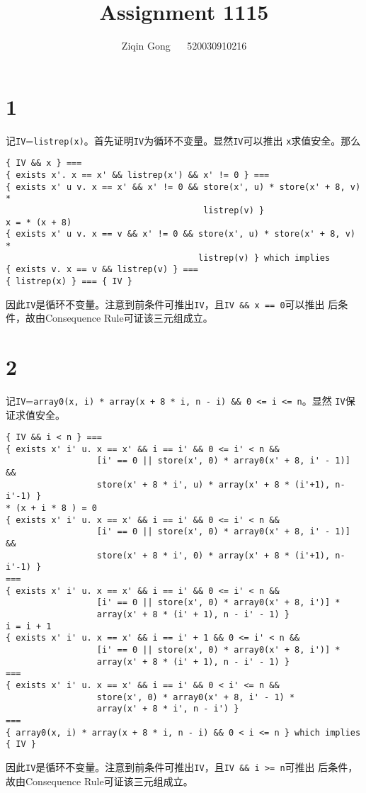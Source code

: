 \documentclass[11pt]{article}
\title{Assignment 1115}
\author{Ziqin Gong $\quad$ 520030910216}
\date{}
\newcommand{\iv}{\texttt{IV}}
\begin{document}
  \maketitle

  \section*{1}

    记\texttt{IV}=\texttt{listrep(x)}。首先证明\iv 为循环不变量。显然\iv 可以推出
    \texttt{x}求值安全。那么

    \begin{lstlisting}
{ IV && x } ===
{ exists x'. x == x' && listrep(x') && x' != 0 } ===
{ exists x' u v. x == x' && x' != 0 && store(x', u) * store(x' + 8, v) *
                                       listrep(v) }
x = * (x + 8)
{ exists x' u v. x == v && x' != 0 && store(x', u) * store(x' + 8, v) *
                                      listrep(v) } which implies
{ exists v. x == v && listrep(v) } ===
{ listrep(x) } === { IV }
    \end{lstlisting}

    因此\iv 是循环不变量。注意到前条件可推出\iv，且\texttt{IV \&\& x == 0}可以推出
    后条件，故由Consequence Rule可证该三元组成立。

  \section*{2}

    记\iv=\texttt{array0(x, i) * array(x + 8 * i, n - i) \&\& 0 <= i <= n}。显然
    \iv 保证求值安全。

    \begin{lstlisting}
{ IV && i < n } ===
{ exists x' i' u. x == x' && i == i' && 0 <= i' < n &&
                  [i' == 0 || store(x', 0) * array0(x' + 8, i' - 1)] &&
                  store(x' + 8 * i', u) * array(x' + 8 * (i'+1), n-i'-1) }
* (x + i * 8 ) = 0
{ exists x' i' u. x == x' && i == i' && 0 <= i' < n &&
                  [i' == 0 || store(x', 0) * array0(x' + 8, i' - 1)] &&
                  store(x' + 8 * i', 0) * array(x' + 8 * (i'+1), n-i'-1) }
===
{ exists x' i' u. x == x' && i == i' && 0 <= i' < n &&
                  [i' == 0 || store(x', 0) * array0(x' + 8, i')] *
                  array(x' + 8 * (i' + 1), n - i' - 1) }
i = i + 1
{ exists x' i' u. x == x' && i == i' + 1 && 0 <= i' < n &&
                  [i' == 0 || store(x', 0) * array0(x' + 8, i')] *
                  array(x' + 8 * (i' + 1), n - i' - 1) }
===
{ exists x' i' u. x == x' && i == i' && 0 < i' <= n &&
                  store(x', 0) * array0(x' + 8, i' - 1) *
                  array(x' + 8 * i', n - i') }
===
{ array0(x, i) * array(x + 8 * i, n - i) && 0 < i <= n } which implies
{ IV }
    \end{lstlisting}

    因此\iv 是循环不变量。注意到前条件可推出\iv，且\texttt{IV \&\& i >= n}可推出
    后条件，故由Consequence Rule可证该三元组成立。
\end{document}
